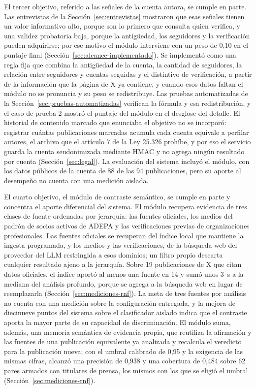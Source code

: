 El tercer objetivo, referido a las señales de la cuenta autora, se cumple en parte. Las entrevistas de la Sección~\ref{sec:entrevistas} mostraron que esas señales tienen un valor informativo alto, porque son lo primero que consulta quien verifica, y una validez probatoria baja, porque la antigüedad, los seguidores y la verificación pueden adquirirse; por ese motivo el módulo interviene con un peso de 0,10 en el puntaje final (Sección~\ref{sec:alcance-implementado}). Se implementó como una regla fija que combina la antigüedad de la cuenta, la cantidad de seguidores, la relación entre seguidores y cuentas seguidas y el distintivo de verificación, a partir de la información que la página de X ya contiene, y cuando esos datos faltan el módulo no se pronuncia y su peso se redistribuye. Las pruebas automatizadas de la Sección~\ref{sec:pruebas-automatizadas} verifican la fórmula y esa redistribución, y el caso de prueba 2 mostró el puntaje del módulo en el desglose del detalle. El historial de contenido marcado que enunciaba el objetivo no se incorporó: registrar cuántas publicaciones marcadas acumula cada cuenta equivale a perfilar autores, el archivo que el artículo 7 de la Ley 25.326 prohíbe, y por eso el servicio guarda la cuenta seudonimizada mediante HMAC y no agrega ningún resultado por cuenta (Sección~\ref{sec:legal}). La evaluación del sistema incluyó el módulo, con los datos públicos de la cuenta de 88 de las 94 publicaciones, pero su aporte al desempeño no cuenta con una medición aislada.

El cuarto objetivo, el módulo de contraste semántico, se cumple en parte y concentra el aporte diferencial del sistema. El módulo recupera evidencia de tres clases de fuente ordenadas por jerarquía: las fuentes oficiales, los medios del padrón de socios activos de ADEPA y las verificaciones previas de organizaciones profesionales. Las fuentes oficiales se recuperan del índice local que mantiene la ingesta programada, y los medios y las verificaciones, de la búsqueda web del proveedor del LLM restringida a esos dominios; un filtro propio descarta cualquier resultado ajeno a la jerarquía. Sobre 19 publicaciones de X que citan datos oficiales, el índice aportó al menos una fuente en 14 y sumó unos 3~s a la mediana del análisis profundo, porque se agrega a la búsqueda web en lugar de reemplazarla (Sección~\ref{sec:mediciones-rnf}). La meta de tres fuentes por análisis no cuenta con una medición sobre la configuración entregada, y la mejora de diecinueve puntos del sistema sobre el clasificador aislado indica que el contraste aporta la mayor parte de su capacidad de discriminación. El módulo suma, además, una memoria semántica de evidencia propia, que reutiliza la afirmación y las fuentes de una publicación equivalente ya analizada y recalcula el veredicto para la publicación nueva; con el umbral calibrado de 0,95 y la exigencia de las mismas cifras, alcanzó una precisión de 0,938 y una cobertura de 0,484 sobre 62 pares armados con titulares de prensa, los mismos con los que se eligió el umbral (Sección~\ref{sec:mediciones-rnf}).

